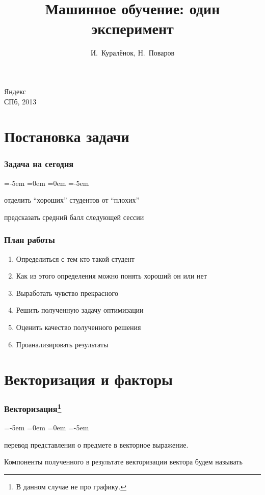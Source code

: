 \documentclass[14pt, fleqn, xcolor={dvipsnames, table}, hyperref={unicode}, babel={english,russian}, inputenc=utf8x]{beamer}
\title{Машинное обучение: один эксперимент\\\small{}}
\author[]{\small{%
И.~Куралёнок,
Н.~Поваров}}
\date{}
\begin{document}
\begin{frame}
\maketitle
\small
\begin{center}
\vspace{-60pt}
\normalsize {\color{red}Я}ндекс \\
\vspace{80pt}
\footnotesize СПб, 2013
\end{center}
\end{frame}

\section{Постановка задачи}
\begin{frame}
\frametitle{Задача на сегодня}
\begin{description}
\leftmargin=-5em
\itemindent=0em
=0em
\leftskip=-5em
\item[Задача:] отделить ``хороших'' студентов от ``плохих''
\item
\item[Формально:] предсказать средний балл следующей сессии
\end{description}
\end{frame}

\begin{frame}
\frametitle{План работы}
\begin{enumerate}
\item Определиться с тем кто такой студент
\item Как из этого определения можно понять хороший он или нет
\item Выработать чувство прекрасного
\item Решить полученную задачу оптимизации
\item Оценить качество полученного решения
\item Проанализировать результаты
\end{enumerate}
\end{frame}

\section{Векторизация и факторы}
\begin{frame}
\frametitle{Векторизация\footnote{В данном случае не про графику.}}
\begin{description}
\leftmargin=-5em
\itemindent=0em
=0em
\leftskip=-5em
\item[Векторизация:] перевод представления о предмете в векторное выражение.
\item[]
\item[] Компоненты полученного в результате векторизации вектора будем называть {}
\end{description}
\end{frame}
\end{document}
